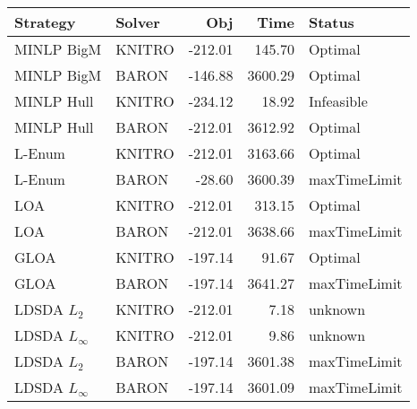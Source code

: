\begin{tabular}{llrrl}
\toprule
Strategy & Solver & Obj & Time & Status \\
\midrule
MINLP BigM & KNITRO & -212.01 & 145.70 & Optimal \\
MINLP BigM & BARON & -146.88 & 3600.29 & Optimal \\
MINLP Hull & KNITRO & -234.12 & 18.92 & Infeasible \\
MINLP Hull & BARON & -212.01 & 3612.92 & Optimal \\
L-Enum & KNITRO & -212.01 & 3163.66 & Optimal \\
L-Enum & BARON & -28.60 & 3600.39 & maxTimeLimit \\
LOA & KNITRO & -212.01 & 313.15 & Optimal \\
LOA & BARON & -212.01 & 3638.66 & maxTimeLimit \\
GLOA & KNITRO & -197.14 & 91.67 & Optimal \\
GLOA & BARON & -197.14 & 3641.27 & maxTimeLimit \\
LDSDA $L_2$ & KNITRO & -212.01 & 7.18 & unknown \\
LDSDA $L_\infty$ & KNITRO & -212.01 & 9.86 & unknown \\
LDSDA $L_2$ & BARON & -197.14 & 3601.38 & maxTimeLimit \\
LDSDA $L_\infty$ & BARON & -197.14 & 3601.09 & maxTimeLimit \\
\bottomrule
\end{tabular}
